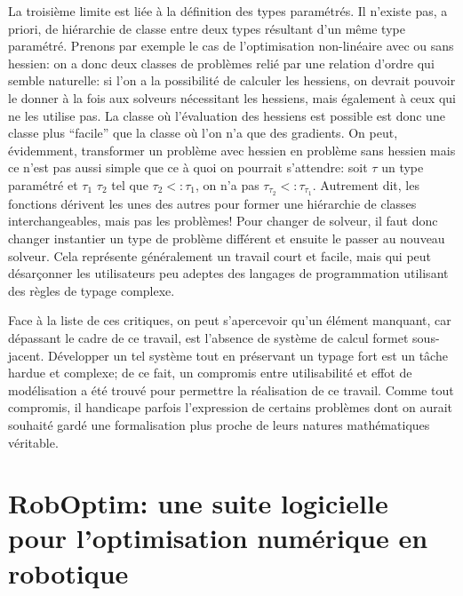 La troisième limite est liée à la définition des types paramétrés. Il
n'existe pas, a priori, de hiérarchie de classe entre deux types
résultant d'un même type paramétré. Prenons par exemple le cas de
l'optimisation non-linéaire avec ou sans hessien: on a donc deux
classes de problèmes relié par une relation d'ordre qui semble
naturelle: si l'on a la possibilité de calculer les hessiens, on
devrait pouvoir le donner à la fois aux solveurs nécessitant les
hessiens, mais également à ceux qui ne les utilise pas. La classe où
l'évaluation des hessiens est possible est donc une classe plus
``facile'' que la classe où l'on n'a que des gradients. On peut,
évidemment, transformer un problème avec hessien en problème sans
hessien mais ce n'est pas aussi simple que ce à quoi on pourrait
s'attendre: soit $\tau$ un type paramétré et $\tau_1$ $\tau_2$ tel que
$\tau_2 <: \tau_1$, on n'a pas $\tau_{\tau_2} <:
\tau_{\tau_1}$. Autrement dit, les fonctions dérivent les unes des
autres pour former une hiérarchie de classes interchangeables, mais
pas les problèmes! Pour changer de solveur, il faut donc changer
instantier un type de problème différent et ensuite le passer au
nouveau solveur. Cela représente généralement un travail court et
facile, mais qui peut désarçonner les utilisateurs peu adeptes des
langages de programmation utilisant des règles de typage complexe.


Face à la liste de ces critiques, on peut s'apercevoir qu'un élément
manquant, car dépassant le cadre de ce travail, est l'absence de
système de calcul formet sous-jacent. Développer un tel système tout
en préservant un typage fort est un tâche hardue et complexe; de ce
fait, un compromis entre utilisabilité et effot de modélisation a été
trouvé pour permettre la réalisation de ce travail. Comme tout
compromis, il handicape parfois l'expression de certains problèmes
dont on aurait souhaité gardé une formalisation plus proche de leurs
natures mathématiques véritable.


\section{RobOptim: une suite logicielle pour l'optimisation numérique en robotique}


